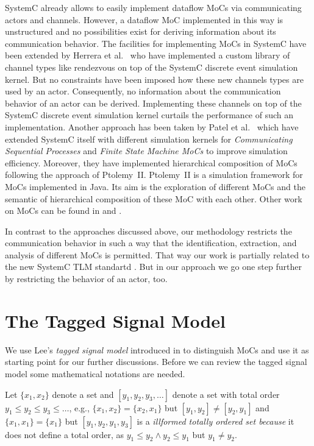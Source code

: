 SystemC \cite{glms:2002} already allows to easily implement
dataflow MoCs via communicating actors and  channels.
However, a dataflow MoC implemented in this way is unstructured
and no possibilities exist for deriving information about its
communication behavior. The facilities for implementing MoCs in
SystemC have been extended by Herrera et al.~\cite{herrerasystemc:2004}
who have implemented a custom library of channel types like rendezvous
on top of the SystemC discrete event simulation kernel. But no
constraints have been imposed how these new channels types are used by
an actor. Consequently, no information about the communication behavior
of an actor can be derived.
Implementing these channels on top of the SystemC discrete event
simulation kernel curtails the performance of such an implementation.
Another approach has been taken by Patel et al.~\cite{fermatmoc:2004}
which have extended SystemC itself with different simulation kernels
for \emph{Communicating Sequential Processes} and \emph{Finite State Machine MoCs}
to improve simulation efficiency. Moreover,
they have implemented hierarchical composition of MoCs following
the approach of \hbox{Ptolemy II}. \hbox{Ptolemy II} \cite{ptolemyII} is a simulation
framework for MoCs implemented in Java. Its aim is the exploration of
different MoCs and the semantic of hierarchical composition of these MoC
with each other. Other work on MoCs can be found in \cite{ZERTT99a} and
\cite{STZETG00}.

In contrast to the approaches discussed above, our methodology restricts
the communication behavior in such a way that the identification,
extraction, and analysis of different MoCs is permitted. That way
our work is partially related to the new SystemC TLM standartd \cite{SystemC-TLM05}.
But in our approach we go one step further by restricting the behavior
of an actor, too.

\section{The Tagged Signal Model}\label{lee-tsm}

We use Lee's \emph{tagged signal model} introduced in \cite{Lee98} to
distinguish MoCs and use it as starting point for our further
discussions. Before we can review the tagged signal model some mathematical
notations are needed.

Let $\{x_1,x_2\}$ denote a set and $[y_1,y_2,y_3,\ldots]$ denote a set
with total order $y_1 \le y_2 \le y_3 \le \ldots$, e.g., $\{x_1,x_2\} = \{x_2,x_1\}$ but
$[y_1,y_2] \ne [y_2,y_1]$ and $\{x_1,x_1\} = \{x_1\}$ but $[ y_1, y_2, y_1, y_3]$
is a \emph{illformed totally ordered set because} it does not define a total order,
as $y_1 \le y_2 \wedge y_2 \le y_1$ but $y_1 \ne y_2$.

